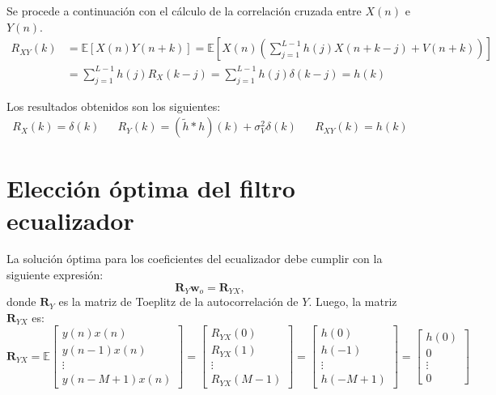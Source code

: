 Se procede a continuación con el cálculo de la correlación cruzada entre $X(n)$ e $Y(n)$.
\begin{align*}
    R_{XY}(k) &= \mathbb{E}[X(n)Y(n+k)] = \mathbb{E}\left[X(n)\left(\sum_{j=1}^{L-1} h(j)X(n + k - j) + V(n+k)\right)\right]\\
    &= \sum_{j=1}^{L-1} h(j) R_X(k-j) = \sum_{j=1}^{L-1} h(j) \delta(k-j) = h(k)
\end{align*}

Los resultados obtenidos son los siguientes:
\begin{align*}
    \boxed{R_X(k) = \delta(k)} &&
    \boxed{R_Y(k) = (\tilde{h} * h)(k) + \sigma_V^2 \delta(k)} &&
    \boxed{R_{XY}(k) = h(k)}
\end{align*}

\section{Elección óptima del filtro ecualizador}
\label{sec:eleccion-optima}

La solución óptima para los coeficientes del ecualizador debe cumplir con la siguiente expresión:
\begin{equation*}
	\mathbf{R}_Y \mathbf{w}_o = \mathbf{R}_{YX},
\end{equation*}
donde $\mathbf{R}_Y$ es la matriz de Toeplitz de la autocorrelación de $Y$. Luego, la matriz $\mathbf{R}_{YX}$ es:
\[
\mathbf{R}_{YX} = \mathbb{E}
\begin{bmatrix}
	y(n) x(n) \\
	y(n-1) x(n) \\
	\vdots \\
	y(n - M + 1) x(n)
\end{bmatrix}
=
\begin{bmatrix}
	R_{YX}(0) \\
	R_{YX}(1) \\
	\vdots \\
	R_{YX}(M-1)
\end{bmatrix}
=
\begin{bmatrix}
	h(0) \\
	h(-1) \\
	\vdots \\
	h(-M+1)
\end{bmatrix}
=
\begin{bmatrix}
	h(0) \\
	0 \\
	\vdots \\
	0
\end{bmatrix}
\]

